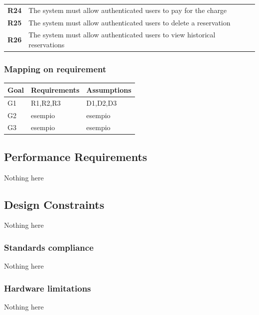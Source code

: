 \begin{table}[H]
\begin{tabularx}{\textwidth}{cX}
        \textbf{R24} & The system must allow authenticated users to pay for the charge                                                     \\
        \textbf{R25} & The system must allow authenticated users to delete a reservation                                                   \\
        \textbf{R26} & The system must allow authenticated users to view historical reservations                                           \\ \bottomrule
    \end{tabularx}
\end{table}

\subsubsection{Mapping on requirement}
\begin{table}[H]
    \begin{tabularx}{\textwidth}{XXX}
        \toprule
        \textbf{Goal} & \textbf{Requirements} & \textbf{Assumptions} \\ \midrule
        G1            & R1,R2,R3              & D1,D2,D3             \\
        G2            & esempio               & esempio              \\
        G3            & esempio               & esempio              \\ \bottomrule
    \end{tabularx}
\end{table}

\subsection{Performance Requirements}
Nothing here

\subsection{Design Constraints}
Nothing here

\subsubsection{Standards compliance}
Nothing here

\subsubsection{Hardware limitations}
Nothing here

